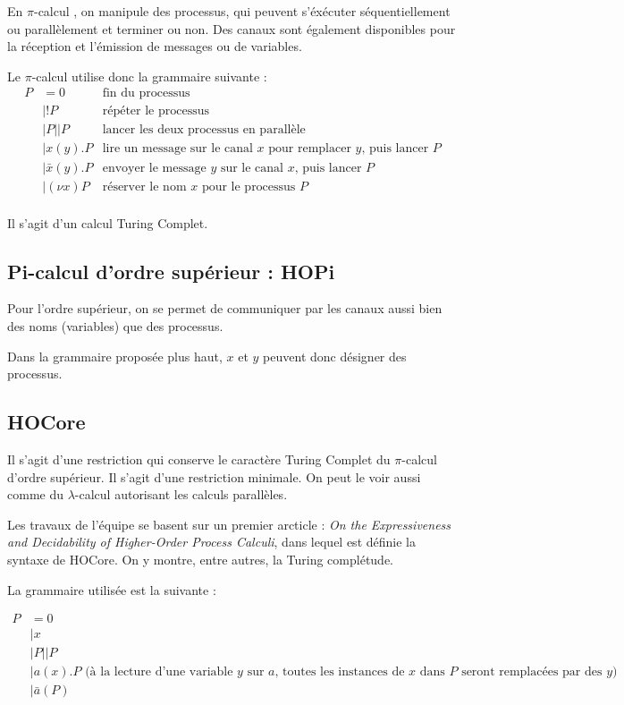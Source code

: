 \documentclass{article}
\def\pic{$\pi$-calcul }
\begin{document}
En \pic, on manipule des processus, qui peuvent s'éxécuter séquentiellement ou parallèlement et terminer ou non. Des canaux sont également disponibles pour la réception et l'émission de messages ou de variables.

Le \pic utilise donc la grammaire suivante :
\begin{align*}
P &= 0 & \text{fin du processus} \\
&| !P &\text{répéter le processus}\\
&| P||P &\text{lancer les deux processus en parallèle}\\
&| x(y).P &\text{lire un message sur le canal $x$ pour remplacer $y$, puis lancer $P$}\\
&| \bar{x}(y).P &\text{envoyer le message $y$ sur le canal $x$, puis lancer $P$}\\
&| (\nu x)P &\text{réserver le nom $x$ pour le processus $P$}\\
\end{align*}

Il s'agit d'un calcul Turing Complet.

\subsection{Pi-calcul d'ordre supérieur : HOPi}
Pour l'ordre supérieur, on se permet de communiquer par les canaux aussi bien des noms (variables) que des processus.

Dans la grammaire proposée plus haut, $x$ et $y$ peuvent donc désigner des processus.

\subsection{HOCore}
Il s'agit d'une restriction qui conserve le caractère Turing Complet du \pic d'ordre supérieur. Il s'agit d'une restriction minimale. On peut le voir aussi comme du $\lambda$-calcul autorisant les calculs parallèles.

Les travaux de l'équipe se basent sur un premier arcticle : \textit{On the Expressiveness and Decidability of Higher-Order Process Calculi}, dans lequel est définie la syntaxe de HOCore. On y montre, entre autres, la Turing complétude.

La grammaire utilisée est la suivante :

\begin{align*}
P &= 0 \\
&| x \\
&| P||P\\
&| a(x).P \text{ (à la lecture d'une variable $y$ sur $a$, toutes les instances de $x$ dans $P$ seront remplacées par des $y$)}\\
&| \bar{a}(P) \\
\end{align*}
\end{document}
